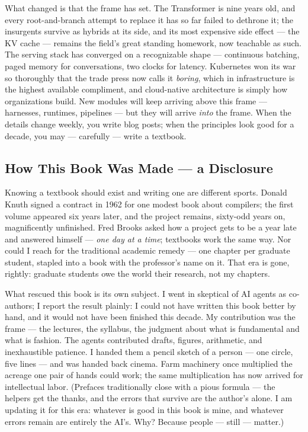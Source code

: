 What changed is that the frame has set. The Transformer is nine years old, and every root-and-branch attempt to replace it has so far failed to dethrone it; the insurgents survive as hybrids at its side, and its most expensive side effect — the KV cache — remains the field's great standing homework, now teachable as such. The serving stack has converged on a recognizable shape — continuous batching, paged memory for conversations, two clocks for latency. Kubernetes won its war so thoroughly that the trade press now calls it \textit{boring}, which in infrastructure is the highest available compliment, and cloud-native architecture is simply how organizations build. New modules will keep arriving above this frame — harnesses, runtimes, pipelines — but they will arrive \textit{into} the frame. When the details change weekly, you write blog posts; when the principles look good for a decade, you may — carefully — write a textbook.

\subsection*{How This Book Was Made — a Disclosure}

Knowing a textbook should exist and writing one are different sports. Donald Knuth signed a contract in 1962 for one modest book about compilers; the first volume appeared six years later, and the project remains, sixty-odd years on, magnificently unfinished. Fred Brooks asked how a project gets to be a year late and answered himself — \textit{one day at a time}; textbooks work the same way. Nor could I reach for the traditional academic remedy — one chapter per graduate student, stapled into a book with the professor's name on it. That era is gone, rightly: graduate students owe the world their research, not my chapters.

What rescued this book is its own subject. I went in skeptical of AI agents as co-authors; I report the result plainly: I could not have written this book better by hand, and it would not have been finished this decade. My contribution was the frame — the lectures, the syllabus, the judgment about what is fundamental and what is fashion. The agents contributed drafts, figures, arithmetic, and inexhaustible patience. I handed them a pencil sketch of a person — one circle, five lines — and was handed back cinema. Farm machinery once multiplied the acreage one pair of hands could work; the same multiplication has now arrived for intellectual labor. (Prefaces traditionally close with a pious formula — the helpers get the thanks, and the errors that survive are the author's alone. I am updating it for this era: whatever is good in this book is mine, and whatever errors remain are entirely the AI's. Why? Because people — still — matter.)

